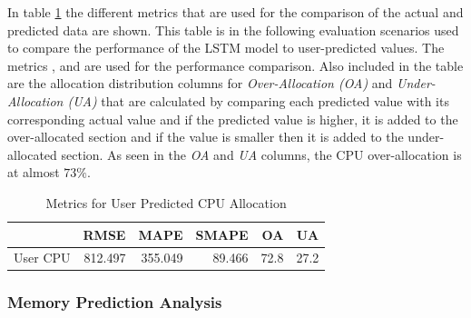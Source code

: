       In table \ref{tab:metric-cpu-user-predicted} the different metrics that are used for the comparison of the actual and predicted data are shown. 
      This table is in the following evaluation scenarios used to compare the performance of the LSTM model to user-predicted values.
      The metrics ,   and  are used for the performance comparison.
      Also included in the table are the allocation distribution columns for \emph{Over-Allocation (OA)} and \emph{Under-Allocation (UA)} that are calculated by comparing each predicted value with its corresponding actual value and if the predicted value is higher, it is added to the over-allocated section and if the value is smaller then it is added to the under-allocated section.
      As seen in the \emph{OA} and \emph{UA} columns, the CPU over-allocation is at almost $73 \%$.
      \begin{table}
        \centering
        \caption{Metrics for User Predicted CPU Allocation}
        \label{tab:metric-cpu-user-predicted}
        \begin{tabular}{|l|rrrrr|}
          \toprule
          {} &     RMSE &     MAPE &   SMAPE &    OA &    UA \\
          \midrule
          User CPU &  812.497 &  355.049 &  89.466 &  72.8 &  27.2 \\
          \bottomrule
          \end{tabular}
      \end{table}

    \subsubsection{Memory Prediction Analysis}
    \label{sec:user-defined-memory-prediction-analysis}

